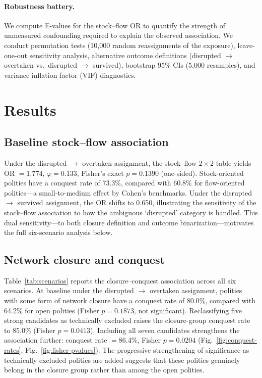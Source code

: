 \documentclass[pdflatex,sn-basic]{sn-jnl}
\theoremstyle{thmstyleone}%
\theoremstyle{thmstyletwo}%
\theoremstyle{thmstylethree}%
\begin{document}
\paragraph{Robustness battery.}
We compute E-values \citep{VanderWeeleDing2017} for the stock--flow OR to quantify the strength of unmeasured confounding required to explain the observed association. We conduct permutation tests (10{,}000 random reassignments of the exposure), leave-one-out sensitivity analysis, alternative outcome definitions (disrupted $\to$ overtaken vs.\ disrupted $\to$ survived), bootstrap 95\% CIs (5{,}000 resamples), and variance inflation factor (VIF) diagnostics.

\section{Results}\label{sec:results}

\subsection{Baseline stock--flow association}\label{sec:results-baseline}

Under the disrupted $\to$ overtaken assignment, the stock--flow $2 \times 2$ table yields OR $= 1.774$, $\varphi = 0.133$, Fisher's exact $p = 0.1390$ (one-sided). Stock-oriented polities have a conquest rate of 73.3\%, compared with 60.8\% for flow-oriented polities---a small-to-medium effect by Cohen's benchmarks. Under the disrupted $\to$ survived assignment, the OR shifts to 0.650, illustrating the sensitivity of the stock--flow association to how the ambiguous `disrupted' category is handled. This dual sensitivity---to both closure definition and outcome binarization---motivates the full six-scenario analysis below.

\subsection{Network closure and conquest}\label{sec:results-closure}

Table~\ref{tab:scenarios} reports the closure--conquest association across all six scenarios. At baseline under the disrupted $\to$ overtaken assignment, polities with some form of network closure have a conquest rate of 80.0\%, compared with 64.2\% for open polities (Fisher $p = 0.1873$, not significant). Reclassifying five strong candidates as technically excluded raises the closure-group conquest rate to 85.0\% (Fisher $p = 0.0413$). Including all seven candidates strengthens the association further: conquest rate $= 86.4\%$, Fisher $p = 0.0204$ (Fig.~\ref{fig:conquest-rates}, Fig.~\ref{fig:fisher-pvalues}). The progressive strengthening of significance as technically excluded polities are added suggests that these polities genuinely belong in the closure group rather than among the open polities.
\end{document}
